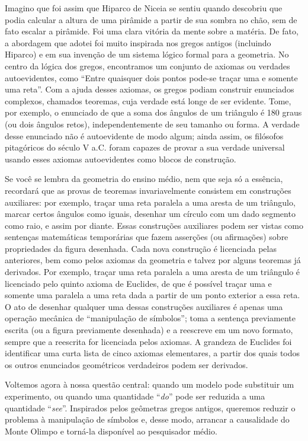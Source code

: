 \documentclass[11pt,a5paper,twoside]{book}
\begin{document}
Imagino que foi assim que Hiparco de Niceia se sentiu quando descobriu que podia calcular a altura de uma pirâmide a partir de sua sombra no chão, sem de fato escalar a pirâmide. Foi uma clara vitória da mente sobre a matéria. De fato, a abordagem que adotei foi muito inspirada nos gregos antigos (incluindo Hiparco) e em sua invenção de um sistema lógico formal para a geometria. No centro da lógica dos gregos, encontramos um conjunto de axiomas ou verdades autoevidentes, como “Entre quaisquer dois pontos pode-se traçar uma e somente uma reta”. Com a ajuda desses axiomas, os gregos podiam construir enunciados complexos, chamados teoremas, cuja verdade está longe de ser evidente. Tome, por exemplo, o enunciado de que a soma dos ângulos de um triângulo é 180 graus (ou dois ângulos retos), independentemente de seu tamanho ou forma. A verdade desse enunciado não é autoevidente de modo algum; ainda assim, os filósofos pitagóricos do século V a.C. foram capazes de provar a sua verdade universal usando esses axiomas autoevidentes como blocos de construção.

Se você se lembra da geometria do ensino médio, nem que seja só a essência, recordará que as provas de teoremas invariavelmente consistem em construções auxiliares: por exemplo, traçar uma reta paralela a uma aresta de um triângulo, marcar certos ângulos como iguais, desenhar um círculo com um dado segmento como raio, e assim por diante. Essas construções auxiliares podem ser vistas como sentenças matemáticas temporárias que fazem asserções (ou afirmações) sobre propriedades da figura desenhada. Cada nova construção é licenciada pelas anteriores, bem como pelos axiomas da geometria e talvez por alguns teoremas já derivados. Por exemplo, traçar uma reta paralela a uma aresta de um triângulo é licenciado pelo quinto axioma de Euclides, de que é possível traçar uma e somente uma paralela a uma reta dada a partir de um ponto exterior a essa reta. O ato de desenhar qualquer uma dessas construções auxiliares é apenas uma operação mecânica de “manipulação de símbolos”; toma a sentença previamente escrita (ou a figura previamente desenhada) e a reescreve em um novo formato, sempre que a reescrita for licenciada pelos axiomas. A grandeza de Euclides foi identificar uma curta lista de cinco axiomas elementares, a partir dos quais todos os outros enunciados geométricos verdadeiros podem ser derivados.

Voltemos agora à nossa questão central: quando um modelo pode substituir um experimento, ou quando uma quantidade “\textit{do}” pode ser reduzida a uma quantidade “\textit{see}”. Inspirados pelos geômetras gregos antigos, queremos reduzir o problema à manipulação de símbolos e, desse modo, arrancar a causalidade do Monte Olimpo e torná-la disponível ao pesquisador médio.
\end{document}
